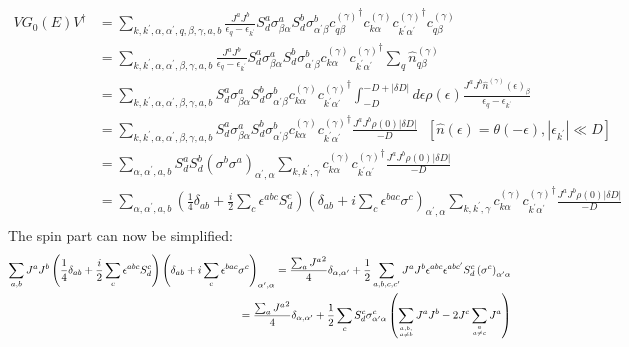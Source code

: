 \begin{equation}\begin{aligned}
	V G_0(E) V^\dagger &= \sum_{k,k^\prime,\alpha,\alpha^\prime,q,\beta,\gamma, a,b} \frac{J^a J^b}{\epsilon_q - \epsilon_{k^\prime}}S_d^a \sigma^a_{\beta\alpha} S_d^b \sigma^b_{\alpha^\prime\beta}{c^{(\gamma)}_{q\beta}}^\dagger {c^{(\gamma)}_{k\alpha}} {c^{(\gamma)}_{k^\prime\alpha^\prime}}^\dagger {c^{(\gamma)}_{q\beta}}\\
			   &= \sum_{k,k^\prime,\alpha,\alpha^\prime,\beta,\gamma, a,b} \frac{J^a J^b}{\epsilon_q - \epsilon_{k^\prime}}S_d^a \sigma^a_{\beta\alpha} S_d^b \sigma^b_{\alpha^\prime\beta} {c^{(\gamma)}_{k\alpha}} {c^{(\gamma)}_{k^\prime\alpha^\prime}}^\dagger \sum_q {\hat n^{(\gamma)}_{q\beta}}\\
			   &= \sum_{k,k^\prime,\alpha,\alpha^\prime,\beta,\gamma, a,b} S_d^a \sigma^a_{\beta\alpha} S_d^b \sigma^b_{\alpha^\prime\beta} {c^{(\gamma)}_{k\alpha}} {c^{(\gamma)}_{k^\prime\alpha^\prime}}^\dagger \int_{-D}^{-D + |\delta D|} d\epsilon \rho(\epsilon) \frac{J^a J^b {\hat n^{(\gamma)}(\epsilon)_{\beta}}}{\epsilon_q - \epsilon_{k^\prime}}\\
			   &= \sum_{k,k^\prime,\alpha,\alpha^\prime,\beta,\gamma, a,b} S_d^a \sigma^a_{\beta\alpha} S_d^b \sigma^b_{\alpha^\prime\beta} {c^{(\gamma)}_{k\alpha}} {c^{(\gamma)}_{k^\prime\alpha^\prime}}^\dagger \frac{J^a J^b \rho(0) |\delta D|}{-D} ~~~\left[\hat n(\epsilon) = \theta(-\epsilon), |\epsilon_{k^\prime}| \ll D\right] \\
			   &= \sum_{\alpha,\alpha^\prime,a,b} S_d^a S_d^b \left(\sigma^b \sigma^a\right)_{\alpha^\prime,\alpha} \sum_{k,k^\prime,\gamma}{c^{(\gamma)}_{k\alpha}} {c^{(\gamma)}_{k^\prime\alpha^\prime}}^\dagger \frac{J^a J^b \rho(0) |\delta D|}{-D} \\
			   &= \sum_{\alpha,\alpha^\prime,a,b} \left(\frac{1}{4}\delta_{ab} + \frac{i}{2}\sum_c \epsilon^{abc}S_d^c\right) \left(\delta_{ab} + i\sum_c \epsilon^{bac}\sigma^c\right)_{\alpha^\prime,\alpha} \sum_{k,k^\prime,\gamma}{c^{(\gamma)}_{k\alpha}} {c^{(\gamma)}_{k^\prime\alpha^\prime}}^\dagger \frac{J^a J^b \rho(0) |\delta D|}{-D} \\
\end{aligned}\end{equation}
The spin part can now be simplified:
\begin{equation}\begin{aligned}
	\sum_{a,b} J^a J^b \left(\frac{1}{4}\delta_{ab} + \frac{i}{2}\sum_c \epsilon^{abc}S_d^c\right) \left(\delta_{ab} + i\sum_c \epsilon^{bac}\sigma^c\right)_{\alpha^\prime,\alpha} = \frac{\sum_a {J^a}^2}{4} \delta_{\alpha,\alpha^\prime} + \frac{1}{2}\sum_{a,b,c,c^\prime}J^a J^b \epsilon^{abc}\epsilon^{abc^\prime}S_d^c \left(\sigma^c\right)_{\alpha^\prime\alpha}\\
	= \frac{\sum_a {J^a}^2}{4} \delta_{\alpha,\alpha^\prime} + \frac{1}{2}\sum_c S_d^c \sigma^c_{\alpha^\prime\alpha}\left(\sum_{a,b,\atop{a\neq b}}J^a J^b - 2 J^c\sum_{a \atop{a \neq c}}J^a\right)
\end{aligned}\end{equation}
